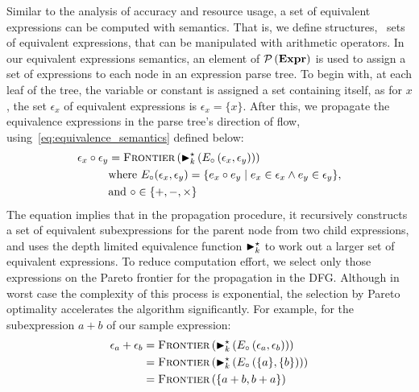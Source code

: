 Similar to the analysis of accuracy and resource usage, a set of equivalent
expressions can be computed with semantics. That is, we define structures,
\ie~sets of equivalent expressions, that can be manipulated with arithmetic
operators. In our equivalent expressions semantics, an element of
$\mathcal{P}\left({\mathbf{Expr}}\right)$ is used to assign a set of expressions to each node
in an expression parse tree. To begin with, at each leaf of the tree, the
variable or constant is assigned a set containing itself, as for $x$, the set
$\epsilon_x$ of equivalent expressions is $\epsilon_x = \{x\}$. After this, we
propagate the equivalence expressions in the parse tree's direction of flow,
using~\eqref{eq:equivalence_semantics} defined below:
\begin{equation}
    \begin{aligned}
        \epsilon_x \circ \epsilon_y &= \operatorname{\textsc{Frontier}}\left(
            \operatorname{\blacktriangleright}^\star_k \left(
                E_\circ \left( \epsilon_x, \epsilon_y \right)
            \right) \right) \\
        & \text{where~}
        E_\circ(\epsilon_x, \epsilon_y) = \{
            e_x \circ e_y \mid e_x \in \epsilon_x \wedge e_y \in \epsilon_y
        \}, \\
        & \text{and~} \circ\in\{+, -, \times\}
    \end{aligned}
    \label{eq:equivalence_semantics}
\end{equation}
The equation implies that in the propagation procedure, it recursively
constructs a set of equivalent subexpressions for the parent node from
two child expressions, and uses the depth limited equivalence function
$\operatorname{\blacktriangleright}^\star_k$ to work out a larger set of equivalent expressions. To reduce
computation effort, we select only those expressions on the Pareto frontier
for the propagation in the DFG\@. Although in worst case the complexity of
this process is exponential, the selection by Pareto optimality accelerates
the algorithm significantly. For example, for the subexpression $a + b$ of our
sample expression:
\begin{equation}
    \begin{aligned}
        \epsilon_a + \epsilon_b
            &= \operatorname{\textsc{Frontier}}\left(
                    \operatorname{\blacktriangleright}^\star_k \left(
                        E_\circ \left( \epsilon_a, \epsilon_b \right)
                    \right)
                \right) \\
            &= \operatorname{\textsc{Frontier}}\left(
                    \operatorname{\blacktriangleright}^\star_k \left(
                        E_\circ \left( \{a\}, \{b\} \right)
                    \right)
                \right) \\
            &= \operatorname{\textsc{Frontier}}\left(
                    \{ a + b, b + a \}
                \right)
    \end{aligned}
\end{equation}
